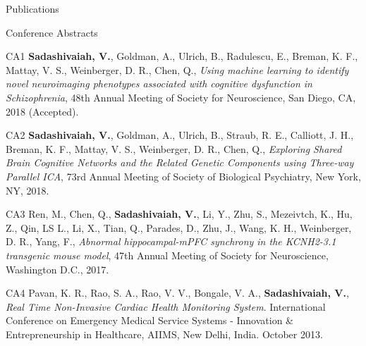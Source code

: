 \documentclass{resume}
\begin{document}
\begin{rSection}{Publications}
\begin{rSubsection}{Conference Abstracts}{}{}{}
\item [CA1] \textbf{Sadashivaiah, V.}, Goldman, A., Ulrich, B., Radulescu, E., Breman, K. F., Mattay, V. S., Weinberger, D. R., Chen, Q., \textit{Using machine learning to identify novel neuroimaging phenotypes associated with cognitive dysfunction in Schizophrenia}, 48th Annual Meeting of Society for Neuroscience, San Diego, CA, 2018 (Accepted).\newline
\item [CA2] \textbf{Sadashivaiah, V.}, Goldman, A., Ulrich, B., Straub, R. E., Calliott, J. H., Breman, K. F., Mattay, V. S., Weinberger, D. R., Chen, Q., \textit{Exploring Shared Brain Cognitive Networks and the Related Genetic Components using Three-way Parallel ICA}, 73rd Annual Meeting of Society of Biological Psychiatry, New York, NY, 2018. \newline
\item [CA3] Ren, M., Chen, Q., \textbf{Sadashivaiah, V.}, Li, Y., Zhu, S., Mezeivtch, K., Hu, Z.,  Qin, LS L., Li, X., Tian, Q., Parades, D., Zhu, J., Wang, K. H., Weinberger, D. R., Yang, F., \textit{Abnormal hippocampal-mPFC synchrony in the KCNH2-3.1 transgenic mouse model}, 47th Annual Meeting of Society for Neuroscience, Washington D.C., 2017. \newline
\item [CA4] Pavan, K. R., Rao, S. A., Rao, V. V., Bongale, V. A., \textbf{Sadashivaiah, V.}, \textit{Real Time Non-Invasive Cardiac Health Monitoring System}. International Conference on Emergency Medical Service Systems - Innovation \& Entrepreneurship in Healthcare, AIIMS, New Delhi, India. October 2013.
\end{rSubsection}
    \end{rSection} 
\vspace{1em}
\end{document}
